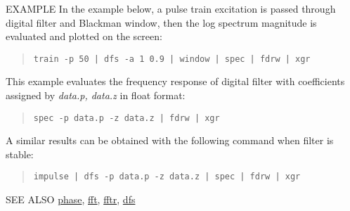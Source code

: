 \begin{qsection}{EXAMPLE}
In the example below, a pulse train excitation is passed
through digital filter and Blackman window,
then the log spectrum magnitude is evaluated and plotted
on the screen:
\begin{quote}
  \verb!train -p 50 | dfs -a 1 0.9 | window | spec | fdrw | xgr !
\end{quote}
\par
This example evaluates the frequency response of
digital filter with coefficients assigned by {\em data.p, data.z}
in float format:
\begin{quote}
  \verb!spec -p data.p -z data.z | fdrw | xgr !
\end{quote}
A similar results can be obtained with the following command
when filter is stable:
\begin{quote}
  \verb!impulse | dfs -p data.p -z data.z | spec | fdrw | xgr !
\end{quote}
\end{qsection}

\begin{qsection}{SEE ALSO}
\hyperlink{phase}{phase},
\hyperlink{fft}{fft},
\hyperlink{fftr}{fftr},
\hyperlink{dfs}{dfs}
\end{qsection}
